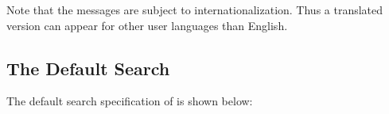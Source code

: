 Note that the messages are subject to internationalization. Thus a
translated version can appear for other user languages than English.


\subsection{The Default Search}

The default search specification of \ExBib{} is shown below:




\endinput
%
